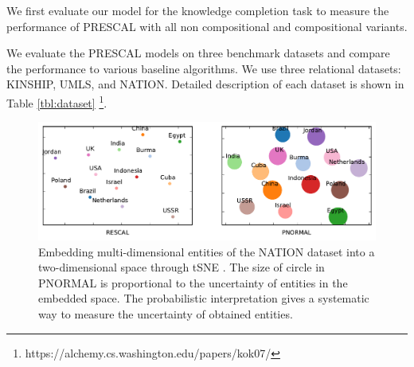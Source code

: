 
We first evaluate our model for the knowledge completion task
to measure the performance of PRESCAL with all non compositional and compositional variants.

We evaluate the PRESCAL models on three benchmark datasets and compare the performance to various baseline 
algorithms. We use three relational datasets: KINSHIP, UMLS, and NATION. Detailed description of each 
dataset is shown in Table \ref{tbl:dataset} \footnote{https://alchemy.cs.washington.edu/papers/kok07/}.

\begin{figure}[t]
	\centering
	
	\includegraphics[width=0.7\linewidth]{images/embedding_nation.pdf}

	\caption{\label{fig:tsne} Embedding multi-dimensional entities of the NATION dataset into a two-dimensional space through tSNE \cite{VanDerMaaten2008}. The size of circle in PNORMAL is proportional to the uncertainty of entities in the embedded space. The probabilistic interpretation gives a systematic way to measure the uncertainty of obtained entities.}
\end{figure}


